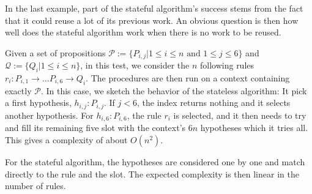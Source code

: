 \documentclass[runningheads]{llncs}
\begin{document}
\begin{figure}
        \end{figure}

In the last example, part of the stateful algorithm's success stems from the fact that it could reuse a lot of its previous work.
An obvious question is then how well does the stateful algorithm work when there is no work to be reused.

Given a set of propositions $\mathcal{P} := \{P_{i,j} | 1 \leq i \leq n \text{ and } 1 \leq j \leq 6\}$ and $\mathcal{Q} :=\{Q_{i} | 1 \leq i \leq n \}$, in this test, we consider the $n$ following rules $r_i : P_{i,1}\to \dots P_{i,6} \to Q_i$.
The procedures are then run on a context containing exactly $\mathcal{P}$.
In this case, we sketch the behavior of the stateless algorithm:
It pick a first hypothesis, $h_{i,j} : P_{i,j}$.
If $j < 6$, the index returns nothing and it selects another hypothesis.
For $h_{i,6} : P_{i,6}$, the rule $r_i$ is selected, and it then needs to try and fill its remaining five slot with the context's $6n$ hypotheses which it tries all.
This gives a complexity of about $O(n^2)$.

For the stateful algorithm, the hypotheses are considered one by one and match directly to the rule and the slot.
The expected complexity is then linear in the number of rules.
\end{document}
